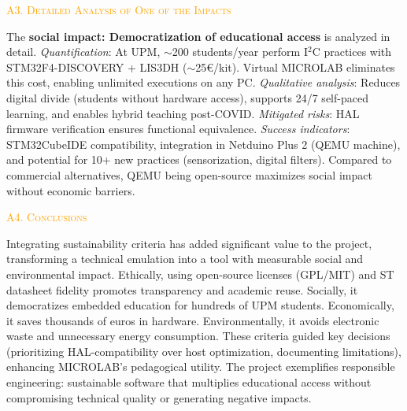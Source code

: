 \vspace{0.1cm}

\Large{\textsc{\textcolor{orange}{A3. Detailed Analysis of One of the Impacts}}} \par
\vspace{0.3cm}
\normalsize{The \textbf{social impact: Democratization of educational access} is analyzed in detail. \textit{Quantification}: At UPM, $\sim$200 students/year perform I$^2$C practices with STM32F4-DISCOVERY + LIS3DH ($\sim$25€/kit). Virtual MICROLAB eliminates this cost, enabling unlimited executions on any PC. \textit{Qualitative analysis}: Reduces digital divide (students without hardware access), supports 24/7 self-paced learning, and enables hybrid teaching post-COVID. \textit{Mitigated risks}: HAL firmware verification ensures functional equivalence. \textit{Success indicators}: STM32CubeIDE compatibility, integration in Netduino Plus 2 (QEMU machine), and potential for 10+ new practices (sensorization, digital filters). Compared to commercial alternatives, QEMU being open-source maximizes social impact without economic barriers.}

\vspace{0.1cm}

\Large{\textsc{\textcolor{orange}{A4. Conclusions}}} \par
\vspace{0.3cm}
\normalsize{Integrating sustainability criteria has added significant value to the project, transforming a technical emulation into a tool with measurable social and environmental impact. Ethically, using open-source licenses (GPL/MIT) and ST datasheet fidelity promotes transparency and academic reuse. Socially, it democratizes embedded education for hundreds of UPM students. Economically, it saves thousands of euros in hardware. Environmentally, it avoids electronic waste and unnecessary energy consumption. These criteria guided key decisions (prioritizing HAL-compatibility over host optimization, documenting limitations), enhancing MICROLAB's pedagogical utility. The project exemplifies responsible engineering: sustainable software that multiplies educational access without compromising technical quality or generating negative impacts.}
